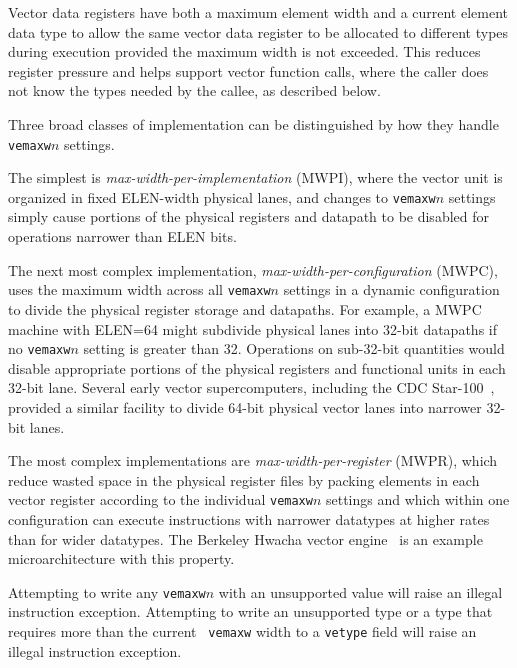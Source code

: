 \begin{commentary}
  Vector data registers have both a maximum element width and a
  current element data type to allow the same vector data register to
  be allocated to different types during execution provided the
  maximum width is not exceeded.  This reduces register pressure and
  helps support vector function calls, where the caller does not know
  the types needed by the callee, as described below.
\end{commentary}

\begin{commentary}
Three broad classes of implementation can be distinguished by how they
handle {\tt vemaxw}$n$ settings.

The simplest is {\em max-width-per-implementation} (MWPI), where the
vector unit is organized in fixed ELEN-width physical lanes, and
changes to {\tt vemaxw}$n$ settings simply cause portions of the
physical registers and datapath to be disabled for operations narrower
than ELEN bits.

The next most complex implementation, {\em
  max-width-per-configuration} (MWPC), uses the maximum width across
all {\tt vemaxw}$n$ settings in a dynamic configuration to divide the
physical register storage and datapaths.  For example, a MWPC machine
with ELEN=64 might subdivide physical lanes into 32-bit datapaths if
no {\tt vemaxw}$n$ setting is greater than 32.  Operations on
sub-32-bit quantities would disable appropriate portions of the
physical registers and functional units in each 32-bit lane.  Several
early vector supercomputers, including the CDC
Star-100~\cite{cdcstart100}, provided a similar facility to divide
64-bit physical vector lanes into narrower 32-bit lanes.

The most complex implementations are {\em max-width-per-register}
(MWPR), which reduce wasted space in the physical register files by
packing elements in each vector register according to the individual
{\tt vemaxw}$n$ settings and which within one configuration can
execute instructions with narrower datatypes at higher rates than for
wider datatypes.  The Berkeley Hwacha vector
engine~\cite{hwachatr,mixedprecision} is an example microarchitecture
with this property.
\end{commentary}

Attempting to write any {\tt vemaxw}$n$ with an unsupported value will
raise an illegal instruction exception.  Attempting to write an
unsupported type or a type that requires more than the current {\tt
  vemaxw} width to a {\tt vetype} field will raise an illegal
instruction exception.


